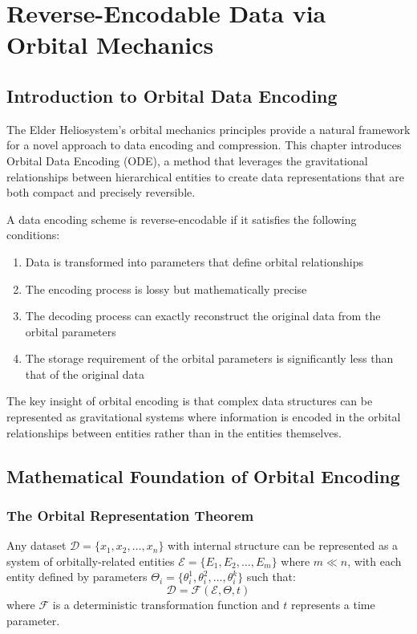\chapter{Reverse-Encodable Data via Orbital Mechanics}

\section{Introduction to Orbital Data Encoding}

The Elder Heliosystem's orbital mechanics principles provide a natural framework for a novel approach to data encoding and compression. This chapter introduces Orbital Data Encoding (ODE), a method that leverages the gravitational relationships between hierarchical entities to create data representations that are both compact and precisely reversible.

\begin{definition}
A data encoding scheme is reverse-encodable if it satisfies the following conditions:
\begin{enumerate}
    \item Data is transformed into parameters that define orbital relationships
    \item The encoding process is lossy but mathematically precise
    \item The decoding process can exactly reconstruct the original data from the orbital parameters
    \item The storage requirement of the orbital parameters is significantly less than that of the original data
\end{enumerate}
\end{definition}

The key insight of orbital encoding is that complex data structures can be represented as gravitational systems where information is encoded in the orbital relationships between entities rather than in the entities themselves.

\section{Mathematical Foundation of Orbital Encoding}

\subsection{The Orbital Representation Theorem}

\begin{theorem}
Any dataset $\mathcal{D} = \{x_1, x_2, \ldots, x_n\}$ with internal structure can be represented as a system of orbitally-related entities $\mathcal{E} = \{E_1, E_2, \ldots, E_m\}$ where $m \ll n$, with each entity defined by parameters $\Theta_i = \{\theta_i^1, \theta_i^2, \ldots, \theta_i^k\}$ such that:
\begin{equation}
\mathcal{D} = \mathcal{F}(\mathcal{E}, \Theta, t)
\end{equation}
where $\mathcal{F}$ is a deterministic transformation function and $t$ represents a time parameter.
\end{theorem}

